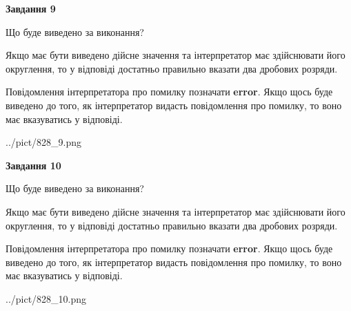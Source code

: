\documentclass[12pt, ukrainian]{article}
\begin{document}
{\begin {Large}
{\begin {center}\textbf{Завдання 9}\end {center}}\par
Що буде виведено за виконання? \par

Якщо має бути виведено дійсне значення та інтерпретатор має здійснювати його округлення, 
то у відповіді достатньо правильно вказати два дробових розряди.

Повідомлення інтерпретатора про помилку позначати \textbf{error}.
Якщо щось буде виведено до того, як інтерпретатор видасть повідомлення про помилку, 
то воно має вказуватись у відповіді. \par

\begin{center}
	{../pict/828_9.png}
\end{center}
\newpage

{\begin {center}\textbf{Завдання 10}\end {center}}\par
Що буде виведено за виконання? \par

Якщо має бути виведено дійсне значення та інтерпретатор має здійснювати його округлення, 
то у відповіді достатньо правильно вказати два дробових розряди.

Повідомлення інтерпретатора про помилку позначати \textbf{error}.
Якщо щось буде виведено до того, як інтерпретатор видасть повідомлення про помилку, 
то воно має вказуватись у відповіді. \par

\begin{center}
	{../pict/828_10.png}
\end{center}
\newpage

\end {Large}}
\end{document}
